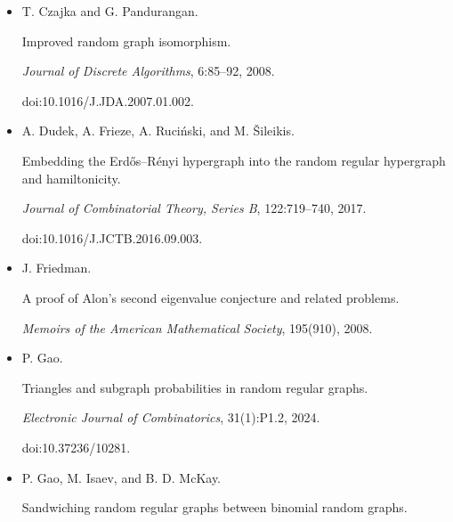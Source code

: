 \documentclass[10pt,a4paper]{article}
\begin{document}
\begin{itemize}
N. A. Cook, L. Goldstein, and T. Johnson.


Size biased couplings and the spectral gap for random regular graphs.


\emph{Annals of Probability}, 46(1):72–125, 2018.





\item[] 
[18]

T. Czajka and G. Pandurangan.


Improved random graph isomorphism.


\emph{Journal of Discrete Algorithms}, 6:85–92, 2008.


doi:10.1016/J.JDA.2007.01.002.





\item[] 
[19]

A. Dudek, A. Frieze, A. Ruciński, and M. Šileikis.


Embedding the Erdős–Rényi hypergraph into the random
regular hypergraph and hamiltonicity.


\emph{Journal of Combinatorial Theory, Series B}, 122:719–740, 2017.


doi:10.1016/J.JCTB.2016.09.003.





\item[] 
[20]

J. Friedman.


A proof of Alon’s second eigenvalue conjecture and related
problems.


\emph{Memoirs of the American Mathematical Society}, 195(910), 2008.





\item[] 
[21]

P. Gao.


Triangles and subgraph probabilities in random regular graphs.


\emph{Electronic Journal of Combinatorics}, 31(1):P1.2, 2024.


doi:10.37236/10281.





\item[] 
[22]

P. Gao, M. Isaev, and B. D. McKay.


Sandwiching random regular graphs between binomial random graphs.



\end{itemize}
\end{document}
